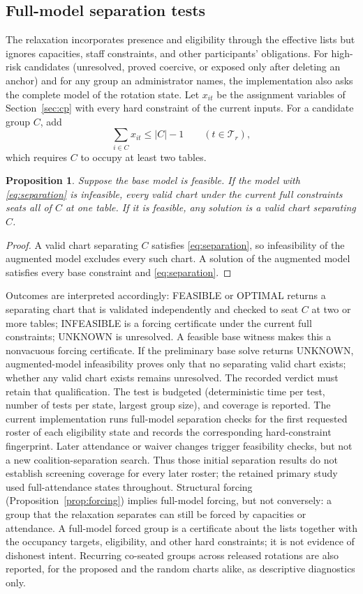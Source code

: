 \documentclass[11pt,a4paper]{article}
\newtheorem{proposition}[theorem]{Proposition}
\theoremstyle{definition}\newtheorem{definition}[theorem]{Definition}
\theoremstyle{remark}\newtheorem{remark}[theorem]{Remark}
\begin{document}
\subsection{Full-model separation tests}\label{sec:fullmodel}
The relaxation incorporates presence and eligibility through the effective lists but ignores capacities, staff constraints, and other participants' obligations. For high-risk candidates (unresolved, proved coercive, or exposed only after deleting an anchor) and for any group an administrator names, the implementation also asks the complete model of the rotation state. Let $x_{it}$ be the assignment variables of Section~\ref{sec:cp} with every hard constraint of the current inputs. For a candidate group $C$, add
\begin{equation}\label{eq:separation}
 \sum_{i\in C}x_{it}\le|C|-1\qquad(t\in\mathcal T_r),
\end{equation}
which requires $C$ to occupy at least two tables.
\begin{proposition}\label{prop:separation}
Suppose the base model is feasible. If the model with \eqref{eq:separation} is infeasible, every valid chart under the current full constraints seats all of $C$ at one table. If it is feasible, any solution is a valid chart separating $C$.
\end{proposition}
\begin{proof}
A valid chart separating $C$ satisfies \eqref{eq:separation}, so infeasibility of the augmented model excludes every such chart. A solution of the augmented model satisfies every base constraint and \eqref{eq:separation}.
\end{proof}
Outcomes are interpreted accordingly: FEASIBLE or OPTIMAL returns a separating chart that is validated independently and checked to seat $C$ at two or more tables; INFEASIBLE is a forcing certificate under the current full constraints; UNKNOWN is unresolved. A feasible base witness makes this a nonvacuous forcing certificate. If the preliminary base solve returns UNKNOWN, augmented-model infeasibility proves only that no separating valid chart exists; whether any valid chart exists remains unresolved. The recorded verdict must retain that qualification. The test is budgeted (deterministic time per test, number of tests per state, largest group size), and coverage is reported. The current implementation runs full-model separation checks for the first requested roster of each eligibility state and records the corresponding hard-constraint fingerprint. Later attendance or waiver changes trigger feasibility checks, but not a new coalition-separation search. Thus those initial separation results do not establish screening coverage for every later roster; the retained primary study used full-attendance states throughout. Structural forcing (Proposition~\ref{prop:forcing}) implies full-model forcing, but not conversely: a group that the relaxation separates can still be forced by capacities or attendance. A full-model forced group is a certificate about the lists together with the occupancy targets, eligibility, and other hard constraints; it is not evidence of dishonest intent. Recurring co-seated groups across released rotations are also reported, for the proposed and the random charts alike, as descriptive diagnostics only.
\end{document}
